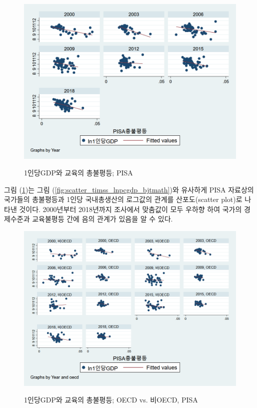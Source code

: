 \begin{figure}
    \centering
    \caption{1인당GDP와 교육의 총불평등; PISA}
    \includegraphics[width=\textwidth]{figure/scatter_lnpcgdp_totmath_pisa.png}
    \label{fig:scatter_pisa_lnpcgdp_bjtmath}
\end{figure}
그림 (\ref{fig:scatter_pisa_lnpcgdp_bjtmath})는 그림 (\ref{fig:scatter_timss_lnpcgdp_bjtmath})와 유사하게 PISA 자료상의 국가들의 총불평등과 1인당 국내총생산의 로그값의 관계를 산포도(scatter plot)로 나타낸 것이다.
2000년부터 2018년까지 조사에서 맞춤값이 모두 우하향 하여 국가의 경제수준과 교육불평등 간에 음의 관계가 있음을 알 수 있다. 

\begin{figure}
    \centering
    \caption{1인당GDP와 교육의 총불평등; OECD vs. 비OECD, PISA}
    \includegraphics[width=\textwidth]{figure/scatter_lnpcgdp_totmath_pisa_oecd.png}
    \label{fig:scatter_pisa_lnpcgdp_bjtmath_oecd}
\end{figure}


